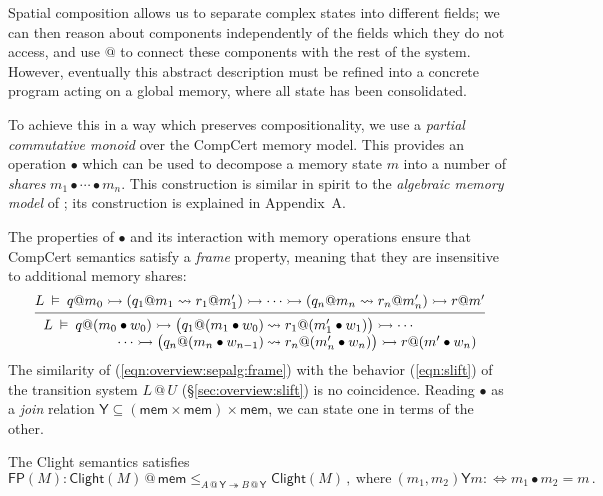 \documentclass[acmsmall,screen,review,anonymous,nonacm]{acmart}
\newcommand{\kw}[1]{\ensuremath{ \mathsf{#1} }}
\newcommand{\jr}{\mathsf{Y}}
\begin{document}
Spatial composition
allows us to separate
complex states into different fields;
we can then reason about components
independently of the fields which they do not access,
and use $\mathbin@$
to connect these components with the rest of the system.
However, eventually this abstract description
must be refined into a concrete program
acting on a global memory,
where all state has been consolidated.

To achieve this in a way which preserves compositionality,
we use a \emph{partial commutative monoid}
over the CompCert memory model.
This provides an operation $\bullet$
which can be used to decompose a memory state $m$ into
a number of \emph{shares}
$
  m_1 \bullet \cdots \bullet m_n
$.
This construction
is similar in spirit to the \emph{algebraic memory model}
of \citet{ccal};
its construction is explained in Appendix~A. %

The properties of $\bullet$
and its interaction with memory operations
ensure that CompCert semantics satisfy
a \emph{frame} property,
meaning that they are insensitive to
additional memory shares:
\begin{equation} \label{eqn:overview:sepalg:frame}
  \begin{prooftree}
  \hypo{
  L \:\vDash\: q@m_0 \rightarrowtail
    (q_1@m_1 \leadsto r_1@m_1') \rightarrowtail
    \cdots \rightarrowtail
    (q_n@m_n \leadsto r_n@m_n') \rightarrowtail
    r@m'}
  \infer1{
   {\begin{array}{r@{\:}l}
    L \:\vDash\: q@(m_0 \bullet w_0) \rightarrowtail
      \big( q_1@(m_1 \bullet w_0) &\leadsto r_1@(m_1' \bullet w_1) \big) \rightarrowtail
      \cdots \\ \cdots \rightarrowtail
      \big( q_n@(m_n \bullet w_{n-1}) &\leadsto r_n@(m_n' \bullet w_n) \big) \rightarrowtail
      r@(m' \bullet w_n)
   \end{array}} }
  \end{prooftree}
\end{equation}
The similarity of (\ref{eqn:overview:sepalg:frame})
with the behavior (\ref{eqn:slift})
of the transition system $L \mathbin@ U$ (\S\ref{sec:overview:slift})
is no coincidence.
Reading $\bullet$ as a \emph{join} relation
$\jr \subseteq (\kw{mem} \times \kw{mem}) \times \kw{mem}$,
we can state one in terms of the other.

\begin{theorem} \label{thm:clightframe}
The Clight semantics satisfies
\[
  \kw{FP}(M) :
  \kw{Clight}(M) \mathbin@ \kw{mem}
  \le_{A \mathbin@ \jr \twoheadrightarrow B \mathbin@ \jr}
  \kw{Clight}(M)
  \,,
  \: \text{where} \:
  (m_1, m_2) \mathrel{\jr} m  :\Leftrightarrow
  m_1 \bullet m_2 = m
  \,.
\]
\end{theorem}
\end{document}

